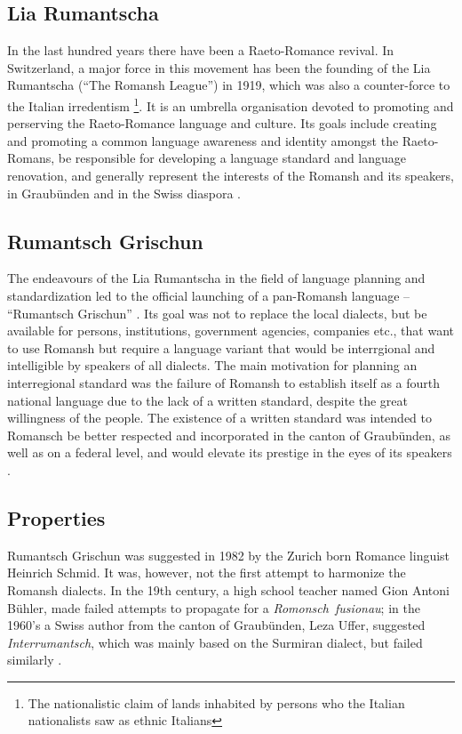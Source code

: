 \subsection{Lia Rumantscha}
In the last hundred years there have been a Raeto-Romance revival. 
In Switzerland, a major force in this movement has been the founding of the Lia Rumantscha (\enquote{The Romansh League}) in 1919, which was also a counter-force to the Italian irredentism \footnote{The nationalistic claim of lands inhabited by persons who the Italian nationalists saw as ethnic Italians}. 
It is an umbrella organisation devoted to promoting and perserving the Raeto-Romance language and culture. Its goals include creating and promoting a common language awareness and identity amongst the Raeto-Romans, be responsible for developing a language standard and language renovation, and generally represent the interests of the Romansh and its speakers, in Graubünden and in the Swiss diaspora \autocite{dazzi2012}.

\subsection{Rumantsch Grischun}
The endeavours of the Lia Rumantscha in the field of language planning and standardization led to the official launching of a pan-Romansh language -- \enquote{Rumantsch Grischun} \autocite[5]{haiman1992}. 
Its goal was not to replace the local dialects, but be available for persons, institutions, government agencies, companies etc., that want to use Romansh but require a language variant that would be interrgional and intelligible by speakers of all dialects. The main motivation for planning an interregional standard was the failure of Romansh to establish itself as a fourth national language due to the lack of a written standard, despite the great willingness of the people.
The existence of a written standard was intended to Romansch be better respected and incorporated in the canton of Graubünden, as well as on a federal level, and would elevate its prestige in the eyes of its speakers \autocite{schmid1982}.

\subsection{Properties}
Rumantsch Grischun was suggested in 1982 by the Zurich born Romance linguist Heinrich Schmid. 
It was, however, not the first attempt to harmonize the Romansh dialects. 
In the 19th century, a high school teacher named Gion Antoni Bühler, made failed attempts to propagate for a \mbox{\emph{Romonsch fusionau}}; in the 1960's a Swiss author from the canton of Graubünden, Leza Uffer, suggested \emph{Interrumantsch}, which was mainly based on the Surmiran dialect, but failed similarly \autocite[39]{liver1999}.

